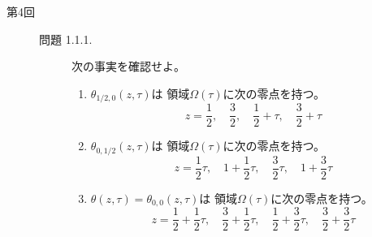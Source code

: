 \documentclass[12pt,b5paper]{ltjsarticle}
\begin{document}
\begin{description}
 \item[第4回]
 \begin{description}
  \item[問題 1.1.1.]
             次の事実を確認せよ。
             \begin{enumerate}
              \item
                   $\theta_{1/2,0}(z,\tau)$は
                   領域$\Omega(\tau)$に次の零点を持つ。
                   \begin{equation}
                    z=\frac{1}{2},\quad
                     \frac{3}{2},\quad
                     \frac{1}{2}+\tau,\quad
                     \frac{3}{2}+\tau
                   \end{equation}

              \item
                   $\theta_{0,1/2}(z,\tau)$は
                   領域$\Omega(\tau)$に次の零点を持つ。
                   \begin{equation}
                    z=\frac{1}{2}\tau,\quad
                     1+\frac{1}{2}\tau,\quad
                     \frac{3}{2}\tau,\quad
                     1+\frac{3}{2}\tau
                   \end{equation}

              \item
                   $\theta(z,\tau)=\theta_{0,0}(z,\tau)$は
                   領域$\Omega(\tau)$に次の零点を持つ。
                   \begin{equation}
                    z=\frac{1}{2}+\frac{1}{2}\tau,\quad
                     \frac{3}{2}+\frac{1}{2}\tau,\quad
                     \frac{1}{2}+\frac{3}{2}\tau,\quad
                     \frac{3}{2}+\frac{3}{2}\tau
                   \end{equation}
             \end{enumerate}

\dotfill



\hrulefill

\end{description}

\end{description}

\hrulefill
\end{document}
